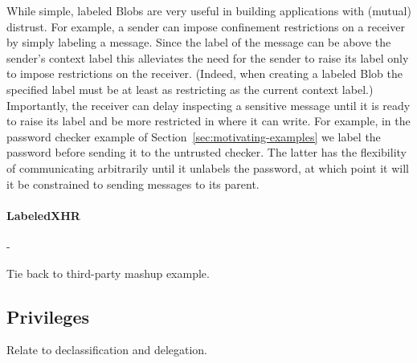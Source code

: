 While simple, labeled Blobs are very useful in building applications
with (mutual) distrust.
%
For example, a sender can impose confinement restrictions on a
receiver by simply labeling a message.
%
Since the label of the message can be above the sender's context label
this alleviates the need for the sender to raise its label only to
impose restrictions on the receiver.
%
(Indeed, when creating a labeled Blob the specified label must be at
least as restricting as the current context label.)
%
Importantly, the receiver can delay inspecting a sensitive message
until it is ready to raise its label and be more restricted in where
it can write.
%
For example, in the password checker example of
Section~\ref{sec:motivating-examples} we label the password
 before sending it to the untrusted checker.
%
The latter has the flexibility of communicating arbitrarily until
it unlabels the password, at which point it will it be constrained to
sending messages to its parent.



\paragraph{LabeledXHR}

- 

Tie back to third-party mashup example.

\subsection{Privileges}
\label{sec:system:privileges}
Relate to declassification and delegation.






